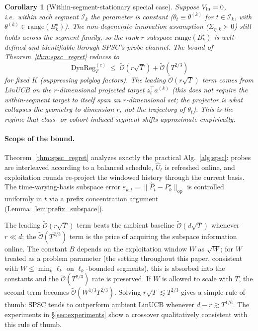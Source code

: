 \documentclass{article}
\newcommand{\op}{\mathrm{op}}
\newcommand{\cI}{\mathcal{I}}
\newcommand{\tilO}{\widetilde{\mathcal{O}}}
\newcommand{\DynReg}{\mathrm{DynReg}}
\newtheorem{corollary}[theorem]{Corollary}
\begin{document}
\begin{corollary}[Within-segment-stationary special case]
\label{cor:stationary_within}
Suppose $V_{\rm in}=0$, i.e.\ within each segment $\cI_k$ the parameter
is constant ($\theta_t\equiv\theta^{(k)}$ for $t\in\cI_k$, with
$\theta^{(k)}\in\mathrm{range}(B^\star_k)$). The non-degenerate
innovation assumption ($\Sigma_{\eta,k}\succ 0$) still holds
\emph{across} the segment family, so the rank-$r$ subspace
$\mathrm{range}(B^\star_k)$ is well-defined and identifiable through
SPSC's probe channel. The bound of Theorem~\ref{thm:spsc_regret}
reduces to
\[
\DynReg_T^{(c)} \;\le\; \tilO(r\sqrt{T}) + \tilO(T^{2/3})
\]
for fixed $K$ (suppressing polylog factors). The leading
$\tilO(r\sqrt{T})$ term comes from LinUCB on the $r$-dimensional
projected target $z_t^\top a^{(k)}$ (this does not require the within-segment
target to itself span an $r$-dimensional set; the projector is what
collapses the geometry to dimension $r$, not the trajectory of
$\theta_t$). This is the regime that class- or cohort-induced segment
shifts approximate empirically.
\end{corollary}

\paragraph{Scope of the bound.} Theorem~\ref{thm:spsc_regret} analyzes
exactly the practical Alg.~\ref{alg:spsc}: probes are interleaved
according to a balanced schedule, $\widehat U_t$ is refreshed online,
and exploitation rounds re-project the windowed history through the
current basis. The time-varying-basis subspace error
$\varepsilon_{k,t}=\|\widehat P_t-P_k^\star\|_\op$ is controlled
uniformly in $t$ via a prefix concentration argument
(Lemma~\ref{lem:prefix_subspace}).

The leading $\tilO(r\sqrt{T})$ term beats the ambient baseline
$\tilO(d\sqrt{T})$ whenever $r \ll d$; the $\tilO(T^{2/3})$ term is
the price of acquiring the subspace information online. The constant
$B$ depends on the exploitation window $W$ as $\sqrt W$; for $W$
treated as a problem parameter (the setting throughout this paper,
consistent with $W\le\min_k\ell_k$ on $\ell_k$-bounded segments), this
is absorbed into the constants and the $\tilO(T^{2/3})$ rate is
preserved. If $W$ is allowed to scale with $T$, the second term
becomes $\tilO(W^{1/3}T^{2/3})$. Solving
$r\sqrt{T}\lesssim T^{2/3}$ gives a simple rule of thumb: SPSC tends
to outperform ambient LinUCB whenever $d-r\gtrsim T^{1/6}$. The
experiments in \S\ref{sec:experiments} show a crossover
qualitatively consistent with this rule of thumb.
\end{document}
